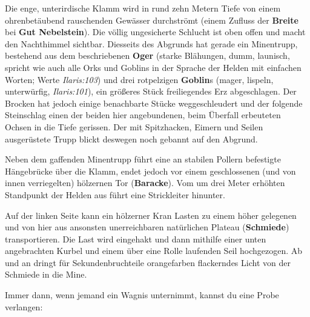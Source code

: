 Die enge, unterirdische Klamm wird in rund zehn Metern Tiefe von einem ohrenbetäubend rauschenden Gewässer durchströmt (einem Zufluss der \textbf{Breite} bei \textbf{Gut Nebelstein}).
Die völlig ungesicherte Schlucht ist oben offen und macht den Nachthimmel sichtbar.
Diesseits des Abgrunds hat gerade ein Minentrupp, bestehend aus dem beschriebenen \textbf{Oger} (starke Blähungen, dumm, launisch, spricht wie auch alle Orks und Goblins in der Sprache der Helden mit einfachen Worten; Werte \emph{Ilaris:103}) und drei rotpelzigen \textbf{Goblin}s (mager, lispeln, unterwürfig, \emph{Ilaris:101}), ein größeres Stück freiliegendes Erz abgeschlagen.
Der Brocken hat jedoch einige benachbarte Stücke weggeschleudert und der folgende Steinschlag einen der beiden hier angebundenen, beim Überfall erbeuteten Ochsen in die Tiefe gerissen.
Der mit Spitzhacken, Eimern und Seilen ausgerüstete Trupp blickt deswegen noch gebannt auf den Abgrund.

Neben dem gaffenden Minentrupp führt eine an stabilen Pollern befestigte Hängebrücke über die Klamm, endet jedoch vor einem geschlossenen (und von innen verriegelten) hölzernen Tor (\textbf{Baracke}).
Vom um drei Meter erhöhten Standpunkt der Helden aus führt eine Strickleiter hinunter.

Auf der linken Seite kann ein hölzerner Kran Lasten zu einem höher gelegenen und von hier aus ansonsten unerreichbaren natürlichen Plateau (\textbf{Schmiede}) transportieren.
Die Last wird eingehakt und dann mithilfe einer unten angebrachten Kurbel und einem über eine Rolle laufenden Seil hochgezogen.
Ab und an dringt für Sekundenbruchteile orangefarben flackerndes Licht von der Schmiede in die Mine.

Immer dann, wenn jemand ein Wagnis unternimmt, kannst du eine Probe verlangen:


